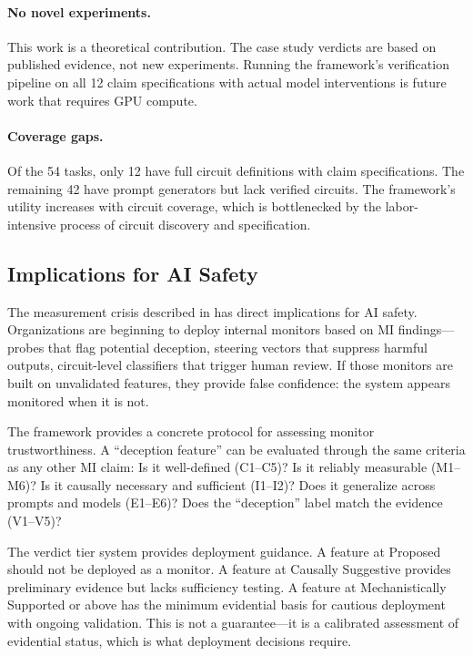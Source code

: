 \documentclass[10pt]{article}
\begin{document}
\paragraph{No novel experiments.} This work is a theoretical contribution. The case study verdicts are based on published evidence, not new experiments. Running the framework's verification pipeline on all 12 claim specifications with actual model interventions is future work that requires GPU compute.

\paragraph{Coverage gaps.} Of the 54 tasks, only 12 have full circuit definitions with claim specifications. The remaining 42 have prompt generators but lack verified circuits. The framework's utility increases with circuit coverage, which is bottlenecked by the labor-intensive process of circuit discovery and specification.

\subsection{Implications for AI Safety}

The measurement crisis described in  has direct implications for AI safety. Organizations are beginning to deploy internal monitors based on MI findings---probes that flag potential deception, steering vectors that suppress harmful outputs, circuit-level classifiers that trigger human review. If those monitors are built on unvalidated features, they provide false confidence: the system appears monitored when it is not.

The framework provides a concrete protocol for assessing monitor trustworthiness. A ``deception feature'' can be evaluated through the same criteria as any other MI claim: Is it well-defined (C1--C5)? Is it reliably measurable (M1--M6)? Is it causally necessary and sufficient (I1--I2)? Does it generalize across prompts and models (E1--E6)? Does the ``deception'' label match the evidence (V1--V5)?

The verdict tier system provides deployment guidance. A feature at Proposed should not be deployed as a monitor. A feature at Causally Suggestive provides preliminary evidence but lacks sufficiency testing. A feature at Mechanistically Supported or above has the minimum evidential basis for cautious deployment with ongoing validation. This is not a guarantee---it is a calibrated assessment of evidential status, which is what deployment decisions require.
\end{document}
